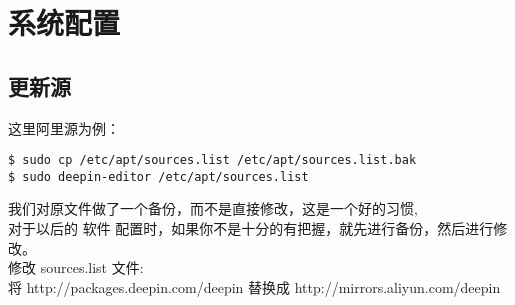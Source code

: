 \section{系统配置}
\subsection{更新源}
这里阿里源为例：
\begin{lstlisting}
$ sudo cp /etc/apt/sources.list /etc/apt/sources.list.bak  
$ sudo deepin-editor /etc/apt/sources.list
\end{lstlisting}
我们对原文件做了一个备份，而不是直接修改，这是一个好的习惯,\\
对于以后的 软件 配置时，如果你不是十分的有把握，就先进行备份，然后进行修改。\\


修改 sources.list 文件: \\
将 http://packages.deepin.com/deepin 替换成 http://mirrors.aliyun.com/deepin